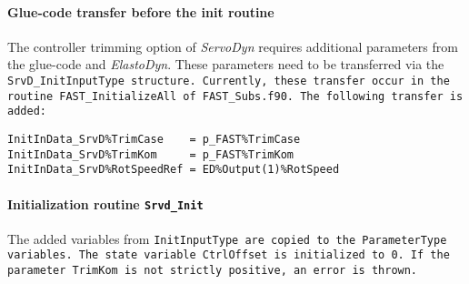 \documentclass[11pt]{article}
\begin{document}
\paragraph{Glue-code transfer before the init routine}
The controller trimming option of \textit{ServoDyn} requires additional parameters from the glue-code and \textit{ElastoDyn}. These parameters need to be transferred via the \tt{SrvD\_InitInputType} structure.
Currently, these transfer occur in the routine \tt{FAST\_InitializeAll} of \tt{FAST\_Subs.f90}. The following transfer is added: 
\fortran
\begin{lstlisting}
InitInData_SrvD%TrimCase    = p_FAST%TrimCase
InitInData_SrvD%TrimKom     = p_FAST%TrimKom
InitInData_SrvD%RotSpeedRef = ED%Output(1)%RotSpeed
\end{lstlisting}



\paragraph{Initialization routine \tt{Srvd\_Init}}
The added variables from \tt{InitInputType} are copied to the \tt{ParameterType} variables.
The state variable \tt{CtrlOffset} is initialized to 0.
If the parameter \tt{TrimKom} is not strictly positive, an error is thrown.
\end{document}
